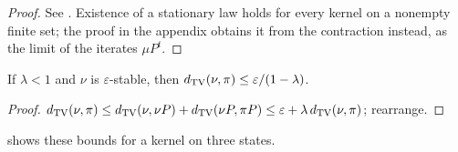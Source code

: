 \begin{proof}
See . Existence of a stationary law holds for every kernel on a nonempty finite set; the proof in the appendix obtains it from the contraction instead, as the limit of the iterates $\mu P^t$.
\end{proof}

\begin{corollary}\label{cor:eps_ball}
If $\lambda<1$ and $\nu$ is $\varepsilon$-stable, then $d_{\mathrm{TV}}(\nu,\pi)\le\varepsilon/(1-\lambda)$.
\end{corollary}

\begin{proof}
$d_{\mathrm{TV}}(\nu,\pi)\le d_{\mathrm{TV}}(\nu,\nu P)+d_{\mathrm{TV}}(\nu P,\pi P)\le\varepsilon+\lambda\,d_{\mathrm{TV}}(\nu,\pi)$; rearrange.
\end{proof}

 shows these bounds for a kernel on three states.


